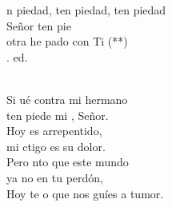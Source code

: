 \begin{cancion}%
	\begin{chorus}%
	n piedad, ten piedad, ten piedad\\
	Señor ten pie\\
	otra  he pado con Ti (**)\\
	. ed.\\
	\end{chorus}%
	\jump\\
	Si ué contra mi hermano \\
	ten piede mi , Señor.\\
	Hoy es arrepentido, \\
	mi ctigo es su dolor.\\
	Pero nto que este mundo \\
	ya no  en tu perdón,\\
	Hoy te o que nos guíes a tumor.\\
\end{cancion}%
